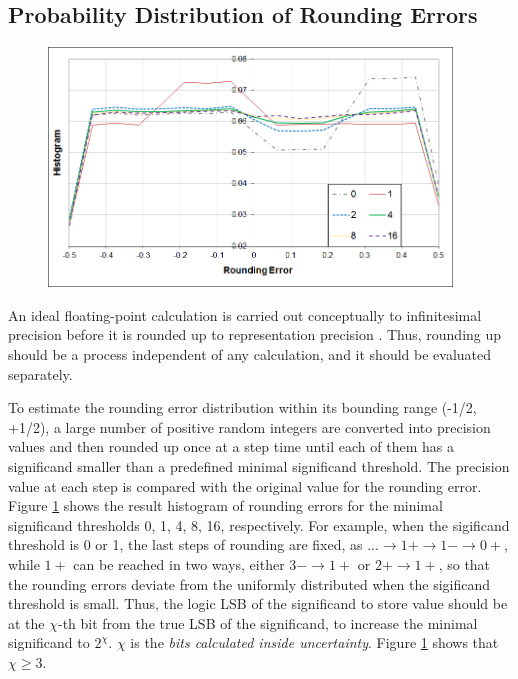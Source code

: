 \documentclass[twoside]{article}
\numberwithin{equation}{section}
\begin{document}
\subsection{Probability Distribution of Rounding Errors}

\begin{figure}[p]
\centering
\includegraphics[height=2.5in]{Prec_Rnd_ErrDist.png}
\label{fig: Prec_Rnd_Err_Dist}
\end{figure}

An ideal floating-point calculation is carried out conceptually to infinitesimal precision before it is rounded up to representation precision \cite{Floating_Point_Standard}\cite{Precise_Numerical_Methods}\cite{Stochastic_Arithmetic}.  
Thus, rounding up should be a process independent of any calculation, and it should be evaluated separately.  

To estimate the rounding error distribution within its bounding range (-1/2, +1/2), a large number of positive random integers are converted into precision values and then rounded up once at a step time until each of them has a significand smaller than a predefined minimal significand threshold.  
The precision value at each step is compared with the original value for the rounding error.  
Figure \ref{fig: Prec_Rnd_Err_Dist} shows the result histogram of rounding errors for the minimal significand thresholds 0, 1, 4, 8, 16, respectively. 
For example, when the sigificand threshold is 0 or 1, the last steps of rounding are fixed, as $ ... \rightarrow 1+ \rightarrow 1- \rightarrow 0+$, while $1+$ can be reached in two ways, either $3- \rightarrow 1+$ or $2+ \rightarrow 1+$, so that the rounding errors deviate from the uniformly distributed when the sigificand threshold is small.
Thus, the logic LSB of the significand to store value should be at the $\chi$-th bit from the true LSB of the significand, to increase the minimal significand to $2^{\chi}$.
$\chi$ is the \emph{bits calculated inside uncertainty}.
Figure \ref{fig: Prec_Rnd_Err_Dist} shows that $\chi \geq 3$. 
\end{document}
